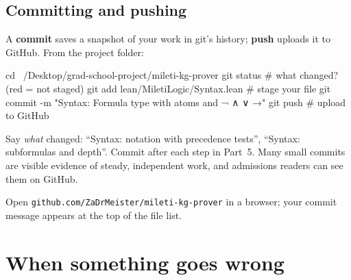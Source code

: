 \documentclass[11pt,a4paper]{article}
\newcommand{\code}[1]{\texttt{#1}}
\begin{document}
\subsection{Committing and pushing}
A \textbf{commit} saves a snapshot of your work in git's history; \textbf{push} uploads it to GitHub. From the project folder:
\begin{shell}
cd ~/Desktop/grad-school-project/mileti-kg-prover
git status                                   # what changed? (red = not staged)
git add lean/MiletiLogic/Syntax.lean         # stage your file
git commit -m "Syntax: Formula type with atoms and ¬ ∧ ∨ →"
git push                                     # upload to GitHub
\end{shell}
\begin{tip}
Say \emph{what} changed: ``Syntax: notation with precedence tests'', ``Syntax: subformulas and depth''. Commit after each step in Part~5. Many small commits are visible evidence of steady, independent work, and admissions readers can see them on GitHub.
\end{tip}
\begin{okbox}
Open \code{github.com/ZaDrMeister/mileti-kg-prover} in a browser; your commit message appears at the top of the file list.
\end{okbox}

\section{When something goes wrong}
\end{document}
